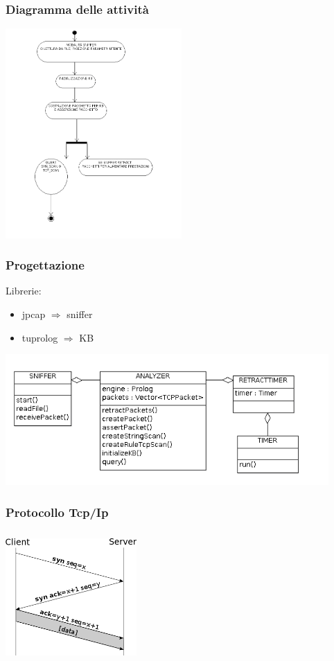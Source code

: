 \documentclass{beamer}
\begin{document}
\begin{frame}
\frametitle{Diagramma delle attivit\`a}
\begin{center}
 \includegraphics[height=8cm]{attivita.png}
\end{center}
\end{frame}



\begin{frame}
\frametitle{Progettazione}
Librerie:

\begin{itemize}
\item jpcap $\Rightarrow$ sniffer
\item tuprolog $\Rightarrow$ KB

\end{itemize}


\begin{center}
 \includegraphics[height=5cm]{classi.png}
\end{center}
\end{frame}



\begin{frame}
\frametitle{Protocollo Tcp/Ip}
\begin{center}
 \includegraphics[width=5cm,height=5cm]{tcp.png}
\end{center}
\end{frame}
\end{document}
